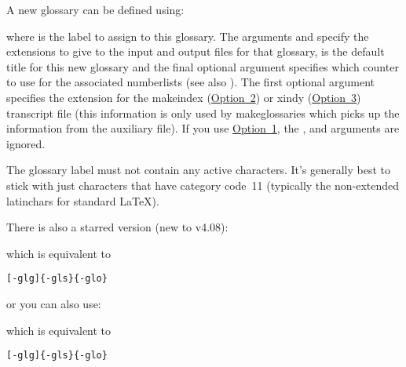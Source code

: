 \documentclass[report,inlinetitle]{nlctdoc}
\newcommand*{\opt}[1]{\hyperlink{option#1}{Option~#1}}
\begin{document}
A new glossary can be defined using:
\begin{definition}[\DescribeMacro{\newglossary}]
\linebreak{}
\end{definition}
where  is the label to assign to this glossary.
The arguments  and  specify the extensions to
give to the input and output files for that glossary, 
is the default title for this new glossary and the final optional
argument  specifies which counter to use for the
associated \glspl{numberlist} (see also
). The first optional argument specifies
the extension for the \gls{makeindex} (\opt2) or \gls{xindy} (\opt3)
transcript file (this information is only used by
\gls{makeglossaries} which picks up the information from the
auxiliary file).  If you use \opt1, the ,
 and  arguments are ignored.

\begin{important}
The glossary label  must not contain any active
characters. It's generally best to stick with just characters that
have category code~11 (typically the non-extended \glspl{latinchar}
for standard \LaTeX).
\end{important}

There is also a starred version (new to v4.08):
\begin{definition}[\DescribeMacro{\newglossary*}]
\end{definition}
which is equivalent to
\begin{alltt}
[-glg]\{-gls\}\{-glo\}\ifpdf\linebreak\fi{}
\end{alltt}
or you can also use:
\begin{definition}[\DescribeMacro{\altnewglossary}]
\end{definition}
which is equivalent to
\begin{alltt}
[-glg]\{-gls\}\{-glo\}
\end{alltt}
\end{document}
